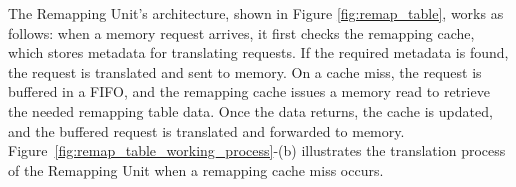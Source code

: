 The Remapping Unit's architecture, shown in Figure \ref{fig:remap_table}, works as follows: when a memory request arrives, it first checks the remapping cache, which stores metadata for translating requests. If the required metadata is found, the request is translated and sent to memory. On a cache miss, the request is buffered in a FIFO, and the remapping cache issues a memory read to retrieve the needed remapping table data. Once the data returns, the cache is updated, and the buffered request is translated and forwarded to memory.
Figure~\ref{fig:remap_table_working_process}-(b) illustrates the translation process of the Remapping Unit when a remapping cache miss occurs.



